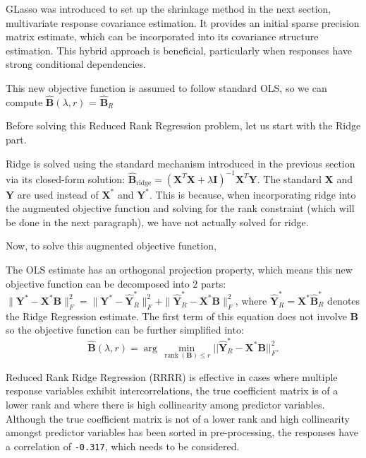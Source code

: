GLasso was introduced to set up the shrinkage method in the next section, multivariate response covariance estimation. It provides an initial sparse precision matrix estimate, which can be incorporated into its covariance structure estimation. This hybrid approach is beneficial, particularly when responses have strong conditional dependencies.


\noindent This new objective function is assumed to follow standard OLS, so we can compute  $\hat{\mathbf{B}}(\lambda, r)$ = $\hat{\mathbf{B}}_R$

Before solving this Reduced Rank Regression problem, let us start with the Ridge part.

Ridge is solved using the standard mechanism introduced in the previous section via its closed-form solution: \(\hat{\mathbf{B}}_{\text{ridge}} = (\mathbf{X}^T \mathbf{X} + \lambda \mathbf{I})^{-1} \mathbf{X}^T \mathbf{Y}.\) The standard \( \mathbf{X} \) and \( \mathbf{Y} \) are used instead of \( \mathbf{X^*} \) and \( \mathbf{Y^*} \). This is because, when incorporating ridge into the augmented objective function and solving for the rank constraint (which will be done in the next paragraph), we have not actually solved for ridge.

Now, to solve this augmented objective function,




The OLS estimate has an orthogonal projection property, which means this new objective function can be decomposed into 2 parts: $
\|\mathbf{Y}^* - \mathbf{X}^* \mathbf{B} \|_F^2 = \|\mathbf{Y}^* - \hat{\mathbf{Y}}^*_R \|_F^2 + \|\hat{\mathbf{Y}}^*_R - \mathbf{X}^* \mathbf{B} \|_F^2
$, where \( \hat{\mathbf{Y}}^*_R = \mathbf{X}^* \hat{\mathbf{B}}^*_R \) denotes the Ridge Regression estimate.\cite{mukherjee2011reduced} The first term of this equation does not involve $\mathbf{B}$ so the objective function can be further simplified into:
\begin{equation*}
    \hat{\mathbf{B}}(\lambda, r) = \arg\min_{\operatorname{rank}(\mathbf{B}) \leq r} ||\hat{\mathbf{Y}}^*_R - \mathbf{X}^* \mathbf{B}||_{F}^2.
\end{equation*}

Reduced Rank Ridge Regression (RRRR) is effective in cases where multiple response variables exhibit intercorrelations, the true coefficient matrix is of a lower rank and where there is high collinearity among predictor variables.\cite{mukherjee2011reduced} Although the true coefficient matrix is not of a lower rank and high collinearity amongst predictor variables has been sorted in pre-processing, the responses have a correlation of \texttt{-0.317}, which needs to be considered.

